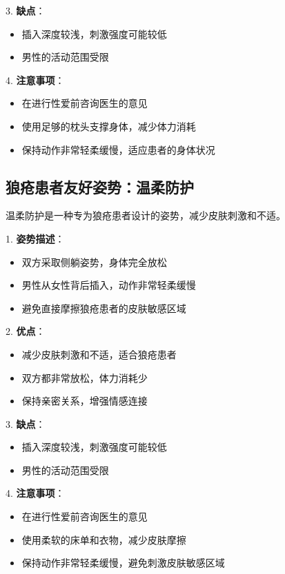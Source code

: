 \documentclass[12pt,UTF8]{ctexbook}
\begin{document}
3. \textbf{缺点}：
  \begin{itemize}
  \item 插入深度较浅，刺激强度可能较低
  \item 男性的活动范围受限
  \end{itemize}

4. \textbf{注意事项}：
  \begin{itemize}
  \item 在进行性爱前咨询医生的意见
  \item 使用足够的枕头支撑身体，减少体力消耗
  \item 保持动作非常轻柔缓慢，适应患者的身体状况
  \end{itemize}

\subsection{狼疮患者友好姿势：温柔防护}

温柔防护是一种专为狼疮患者设计的姿势，减少皮肤刺激和不适。

1. \textbf{姿势描述}：
  \begin{itemize}
  \item 双方采取侧躺姿势，身体完全放松
  \item 男性从女性背后插入，动作非常轻柔缓慢
  \item 避免直接摩擦狼疮患者的皮肤敏感区域
  \end{itemize}

2. \textbf{优点}：
  \begin{itemize}
  \item 减少皮肤刺激和不适，适合狼疮患者
  \item 双方都非常放松，体力消耗少
  \item 保持亲密关系，增强情感连接
  \end{itemize}

3. \textbf{缺点}：
  \begin{itemize}
  \item 插入深度较浅，刺激强度可能较低
  \item 男性的活动范围受限
  \end{itemize}

4. \textbf{注意事项}：
  \begin{itemize}
  \item 在进行性爱前咨询医生的意见
  \item 使用柔软的床单和衣物，减少皮肤摩擦
  \item 保持动作非常轻柔缓慢，避免刺激皮肤敏感区域
  \end{itemize}
\end{document}
